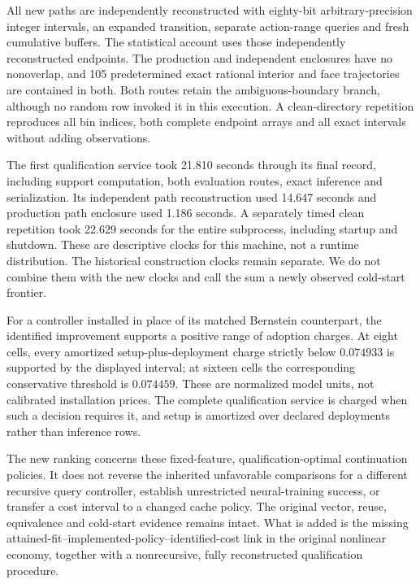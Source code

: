All new paths are independently reconstructed with eighty-bit arbitrary-precision integer intervals, an expanded transition, separate action-range queries and fresh cumulative buffers. The statistical account uses those independently reconstructed endpoints. The production and independent enclosures have no nonoverlap, and 105 predetermined exact rational interior and face trajectories are contained in both. Both routes retain the ambiguous-boundary branch, although no random row invoked it in this execution. A clean-directory repetition reproduces all bin indices, both complete endpoint arrays and all exact intervals without adding observations.

The first qualification service took 21.810 seconds through its final record, including support computation, both evaluation routes, exact inference and serialization. Its independent path reconstruction used 14.647 seconds and production path enclosure used 1.186 seconds. A separately timed clean repetition took 22.629 seconds for the entire subprocess, including startup and shutdown. These are descriptive clocks for this machine, not a runtime distribution. The historical construction clocks remain separate. We do not combine them with the new clocks and call the sum a newly observed cold-start frontier.

For a controller installed in place of its matched Bernstein counterpart, the identified improvement supports a positive range of adoption charges. At eight cells, every amortized setup-plus-deployment charge strictly below $0.074933$ is supported by the displayed interval; at sixteen cells the corresponding conservative threshold is $0.074459$. These are normalized model units, not calibrated installation prices. The complete qualification service is charged when such a decision requires it, and setup is amortized over declared deployments rather than inference rows.

The new ranking concerns these fixed-feature, qualification-optimal continuation policies. It does not reverse the inherited unfavorable comparisons for a different recursive query controller, establish unrestricted neural-training success, or transfer a cost interval to a changed cache policy. The original vector, reuse, equivalence and cold-start evidence remains intact. What is added is the missing attained-fit--implemented-policy--identified-cost link in the original nonlinear economy, together with a nonrecursive, fully reconstructed qualification procedure.

